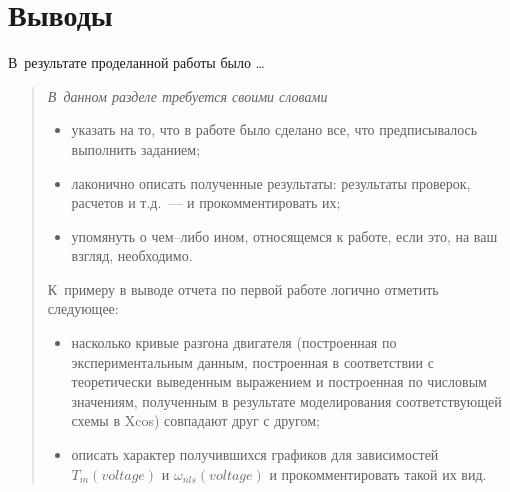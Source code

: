 \documentclass[12pt,titlepage,a4paper]{article}
\begin{document}
\section{Выводы}
\hspace{\parindent}В~результате проделанной работы было \dots
\begin{quote}
\itshape В~данном разделе требуется своими словами
\begin{itemize}
\item указать на то, что в работе было сделано все, что предписывалось выполнить заданием;
\item лаконично описать полученные результаты: результаты проверок, расчетов и т.д.~--- и прокомментировать их;
\item упомянуть о чем--либо ином, относящемся к работе, если это, на ваш взгляд, необходимо.
\end{itemize}
К~примеру в выводе отчета по первой работе логично отметить следующее:
\begin{itemize}
\item насколько кривые разгона двигателя (построенная по экспериментальным данным, построенная в соответствии с теоретически выведенным выражением и построенная по числовым значениям, полученным в результате моделирования соответствующей схемы в Xcos) совпадают друг с другом;
\item описать характер получившихся графиков для зависимостей $T_m(voltage)$ и $\omega_{nls}(voltage)$ и прокомментировать такой их вид.
\end{itemize}
\end{quote}
\end{document}
